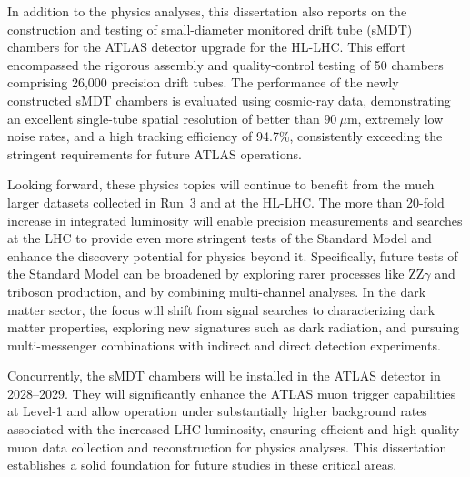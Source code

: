 In addition to the physics analyses, this dissertation also reports on the construction and testing of small-diameter monitored drift tube (sMDT) chambers for the ATLAS detector upgrade for the HL-LHC. This effort encompassed the rigorous assembly and quality-control testing of 50 chambers comprising 26,000 precision drift tubes. The performance of the newly constructed sMDT chambers is evaluated using cosmic-ray data, demonstrating an excellent single-tube spatial resolution of better than $90~\mu\text{m}$, extremely low noise rates, and a high tracking efficiency of 94.7\%, consistently exceeding the stringent requirements for future ATLAS operations.

Looking forward, these physics topics will continue to benefit from the much larger datasets collected in Run~3 and at the HL-LHC. The more than 20-fold increase in integrated luminosity will enable precision measurements and searches at the LHC to provide even more stringent tests of the Standard Model and enhance the discovery potential for physics beyond it. Specifically, future tests of the Standard Model can be broadened by exploring rarer processes like $\text{ZZ}\gamma$ and triboson production, and by combining multi-channel analyses. In the dark matter sector, the focus will shift from signal searches to characterizing dark matter properties, exploring new signatures such as dark radiation, and pursuing multi-messenger combinations with indirect and direct detection experiments.

Concurrently, the sMDT chambers will be installed in the ATLAS detector in 2028--2029. They will significantly enhance the ATLAS muon trigger capabilities at Level-1 and allow operation under substantially higher background rates associated with the increased LHC luminosity, ensuring efficient and high-quality muon data collection and reconstruction for physics analyses. This dissertation establishes a solid foundation for future studies in these critical areas.